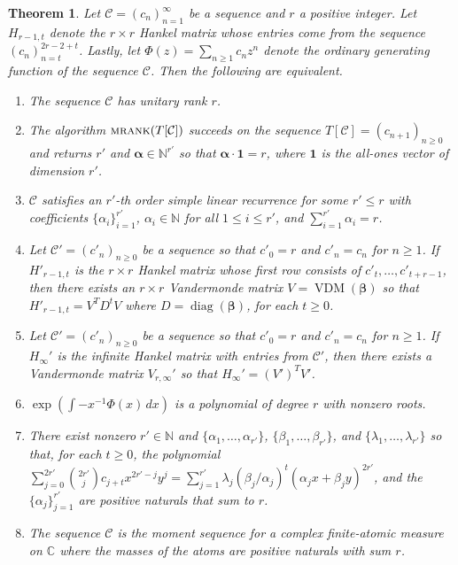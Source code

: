 \documentclass[12pt,reqno]{article}
\newtheorem{theorem}{Theorem}
\newcommand{\malg}{\textsc{mrank}}
\DeclareMathOperator{\diag}{diag}
\DeclareMathOperator{\vdm}{VDM}
\begin{document}
\begin{theorem}\label{Thm:TFAEforDC}
Let $\mathcal{C} = (c_n)_{n=1}^\infty$ be a sequence and $r$ a positive integer. Let $H_{r-1,t}$ denote the $r \times r$ Hankel matrix whose entries come from the sequence $(c_n)_{n=t}^{2r-2+t}$. Lastly, let $\Phi(z) = \sum_{n \geq 1} c_n z^n$ denote the ordinary generating function of the sequence $\mathcal{C}$. Then the following are equivalent. 
\begin{enumerate}
\item The sequence $\mathcal{C}$ has unitary rank $r$. 
\item The algorithm $\malg(T[\mathcal{C}])$ succeeds on the sequence $T [\mathcal{C}] = (c_{n+1})_{n \geq 0}$ and returns $r'$ and $\boldsymbol{\alpha} \in \mathbb{N}^{r'}$ so that $\boldsymbol{\alpha} \cdot \mathbf{1} = r$, where $\mathbf{1}$ is the all-ones vector of dimension $r'$.  
\item $\mathcal{C}$ satisfies an $r'$-th order simple linear recurrence for some $r' \leq r$ with coefficients $\{\alpha_i\}_{i=1}^{r'}$, $\alpha_i \in\mathbb{N}$ for all $1\leq i\leq r'$, and $\sum_{i=1}^{r'}\alpha_i = r$. 
\item Let $\mathcal{C}' = (c'_n)_{n\geq 0}$ be a sequence so that $c'_0 = r$ and $c'_n = c_{n}$ for $n\geq 1$. If $H'_{r-1,t}$ is the $r \times r$ Hankel matrix whose first row consists of $c'_t,\ldots,c'_{t+r-1}$, then there exists an $r\times r$ Vandermonde matrix $V = \vdm(\boldsymbol{\beta})$ so that $H'_{r-1,t} = V^T D^t V$ where $D = \diag(\boldsymbol{\beta})$, for each $t\geq 0$. 
\item Let $\mathcal{C}' = (c'_n)_{n\geq 0}$ be a sequence so that $c'_0 = r$ and $c'_n = c_{n}$ for $n\geq 1$. If $H_\infty'$ is the infinite Hankel matrix with entries from $\mathcal{C}'$, then there exists a Vandermonde matrix $V_{r,\infty}'$ so that $H_\infty' = (V')^TV'$.
\item $\exp(\int -x^{-1} \Phi(x) \, dx)$ is a polynomial of degree $r$ with nonzero roots. 
\item There exist nonzero $r' \in \mathbb{N}$ and $\{\alpha_1,\ldots,\alpha_{r'}\}$, $\{\beta_1,\ldots,\beta_{r'}\}$, and $\{\lambda_1,\ldots,\lambda_{r'}\}$ so that, for each $t \geq 0$, the polynomial $\sum_{j=0}^{2r'} \binom{2r'}{j} c_{j+t} x^{2r'-j} y^{j} = \sum_{j=1}^{r'} \lambda_j (\beta_j/\alpha_j)^t (\alpha_j x + \beta_j y)^{2r'}$,  
and the $\{\alpha_j\}_{j=1}^{r'}$ are positive naturals that sum to $r$. 

\item The sequence $\mathcal{C}$ is the moment sequence for a complex finite-atomic measure on $\mathbb{C}$ where the masses of the atoms are positive naturals with sum $r$. 

\end{enumerate}
\end{theorem}
\end{document}
